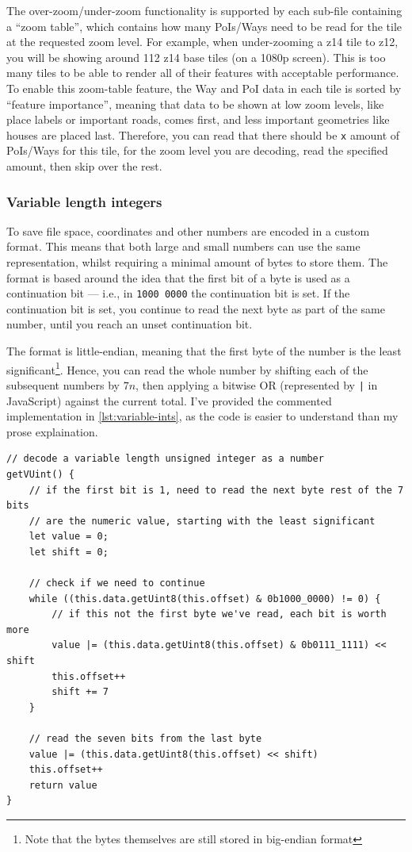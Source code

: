 \documentclass[hyphens]{final_report}
\begin{document}
The over-zoom/under-zoom functionality is supported by each sub-file containing a ``zoom table'', which contains how many PoIs/Ways need to be read for the tile at the requested zoom level. For example, when under-zooming a z14 tile to z12, you will be showing around 112 z14 base tiles (on a 1080p screen). This is too many tiles to be able to render all of their features with acceptable performance. To enable this zoom-table feature, the Way and PoI data in each tile is sorted by ``feature importance'', meaning that data to be shown at low zoom levels, like place labels or important roads, comes first, and less important geometries like houses are placed last. Therefore, you can read that there should be \texttt{x} amount of PoIs/Ways for this tile, for the zoom level you are decoding, read the specified amount, then skip over the rest.

\subsubsection{Variable length integers}

To save file space, coordinates and other numbers are encoded in a custom format. This means that both large and small numbers can use the same representation, whilst requiring a minimal amount of bytes to store them. The format is based around the idea that the first bit of a byte is used as a continuation bit --- i.e., in \texttt{1000 0000} the continuation bit is set. If the continuation bit is set, you continue to read the next byte as part of the same number, until you reach an unset continuation bit.

The format is little-endian, meaning that the first byte of the number is the least significant\footnote{Note that the bytes themselves are still stored in big-endian format}. Hence, you can read the whole number by shifting each of the subsequent numbers by \(7n\), then applying a bitwise OR (represented by \texttt{|} in JavaScript) against the current total. I've provided the commented implementation in \autoref{lst:variable-ints}, as the code is easier to understand than my prose explaination. 

\begin{lstlisting}[caption=Parsing variable length integers, label=lst:variable-ints]
// decode a variable length unsigned integer as a number
getVUint() {
    // if the first bit is 1, need to read the next byte rest of the 7 bits
    // are the numeric value, starting with the least significant
    let value = 0;
    let shift = 0;

    // check if we need to continue
    while ((this.data.getUint8(this.offset) & 0b1000_0000) != 0) {
        // if this not the first byte we've read, each bit is worth more
        value |= (this.data.getUint8(this.offset) & 0b0111_1111) << shift
        this.offset++
        shift += 7
    }

    // read the seven bits from the last byte
    value |= (this.data.getUint8(this.offset) << shift)
    this.offset++
    return value
}
\end{lstlisting}
\end{document}

